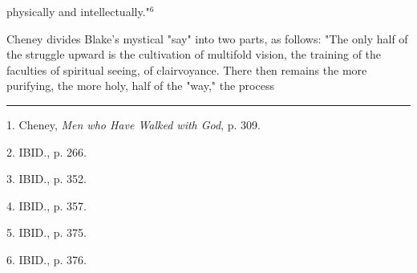 physically and intellectually."$^{6}$\par
\vspace*{0.5\baselineskip}
Cheney divides Blake's mystical "say" into two parts, as follows: "The only
half of the struggle upward is the cultivation of multifold vision, the training of the faculties
of spiritual seeing, of clairvoyance. There then remains the more purifying, the more holy, half of the
"way," the process\linebreak
\null\par
\vspace*{-\baselineskip}
\vspace*{\fill}
\noindent\rule{0.25\textwidth}{0.4pt}\par
1. Cheney, \textit{Men who Have Walked with God}, p. 309.\par
2. IBID., p. 266.\par
3. IBID., p. 352.\par
4. IBID., p. 357.\par
5. IBID., p. 375.\par
6. IBID., p. 376.\par

\newpage

